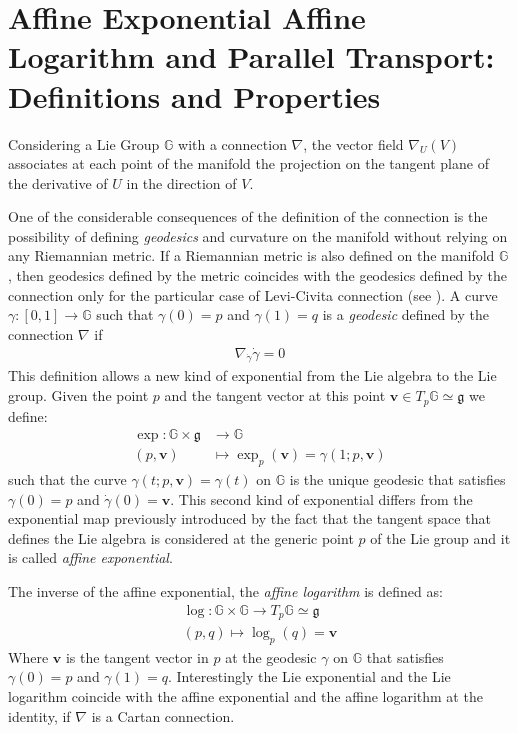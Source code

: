 \section{Affine Exponential Affine Logarithm and Parallel Transport: Definitions and Properties}\label{se:pt}

Considering a Lie Group $\mathbb{G}$ with a connection $\nabla$, the vector field $\nabla_{U}(V)$ associates at each point of the manifold the projection on the tangent plane of the derivative of $U$ in the direction of $V$. 

One of the considerable consequences of the definition of the connection is the possibility of defining \emph{geodesics} and curvature on the manifold without relying on any Riemannian metric. If a Riemannian metric is also defined on the manifold $\mathbb{G} $, then geodesics defined by the metric coincides with the geodesics defined by the connection only for the particular case of Levi-Civita connection (see \cite{do1992riemannian}). A curve $\gamma:[0,1]\rightarrow \mathbb{G}$ such that $\gamma(0)=p$ and $\gamma(1) = q$ is a \emph{geodesic} defined by the connection $\nabla$ if 
\begin{align}\label{def:geodesics_eq}
\nabla_{\dot{\gamma}}\dot{\gamma} = 0 %
\end{align}
This definition allows a new kind of exponential from the Lie algebra to the Lie group. Given the point $p$ and the tangent vector at this point $\mathbf{v} \in T_{p}\mathbb{G}\simeq \mathfrak{g}$ we define: 
\begin{align*}
\exp :  \mathbb{G}  \times \mathfrak{g}     &\longrightarrow \mathbb{G}  
\\ 
(p,\mathbf{v}) &\longmapsto \exp_{p}(\mathbf{v})  = \gamma(1; p,\mathbf{v})
\end{align*}
such that the curve $\gamma(t;p,\mathbf{v}) = \gamma(t)$ on $\mathbb{G}$ is the unique geodesic that satisfies $\gamma(0) = p$ and $\dot{\gamma}(0) =  \mathbf{v} $.
This second kind of exponential differs from the exponential map previously introduced by the fact that the tangent space that defines the Lie algebra is considered at the generic point $p$ of the Lie group and it is called \emph{affine exponential}.

\noindent
The inverse of the affine exponential, the \emph{affine logarithm} is defined as:
\begin{align*}
\log :  \mathbb{G}  \times \mathbb{G}   \longrightarrow T_{p}\mathbb{G}   \simeq \mathfrak{g} 
\\ 
(p,q) \longmapsto \log_{p}(q)  = \mathbf{v} 
\end{align*}
Where $\mathbf{v} $ is the tangent vector in $p$ at the geodesic $\gamma$ on $\mathbb{G} $ that satisfies $\gamma(0) = p$ and $\gamma(1) = q$. Interestingly the Lie exponential and the Lie logarithm coincide with the affine exponential and the affine logarithm at the identity, if $\nabla$ is a Cartan connection.

